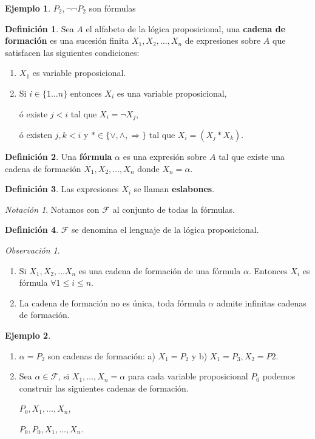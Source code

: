 \documentclass[a4paper,11pt]{article}
\theoremstyle{definition}
\newtheorem{defn}{Definición}[section]
\newtheorem{exap}{Ejemplo}[section]
\theoremstyle{remark}
\newtheorem*{remk}{Observación}
\newtheorem*{notc}{Notación}
\begin{document}
\begin{exap}
$P_2, \neg\neg P_2$ son fórmulas
\end{exap}

\begin{defn}
Sea $A$ el alfabeto de la lógica proposicional, una \textbf{cadena de
formación} es una sucesión finita $X_1, X_2, \dots, X_n$ de expresiones
sobre $A$ que satisfacen las siguientes condiciones:

\begin{enumerate}
\item $X_1$ es variable proposicional.
\item Si $i \in \{1\dots n\}$ entonces $X_i$ es una variable proposicional,

ó existe $j < i$ tal que $X_i = \neg X_j$, 

ó existen $j, k < i$ y $\ast \in \{ \vee, \wedge, \Rightarrow \}$ tal que 
$X_i = (X_j \ast X_k)$.
\end{enumerate}
\end{defn}

\begin{defn}
Una \textbf{fórmula} $\alpha$ es una expresión sobre $A$ tal que existe una
cadena de formación $X_1, X_2, \dots, X_n$ donde $X_n = \alpha$.
\end{defn}

\begin{defn}
Las expresiones $X_i$ se llaman \textbf{eslabones}.
\end{defn}

\begin{notc}
Notamos con $\mathcal F$ al conjunto de todas la fórmulas.
\end{notc}

\begin{defn}
$\mathcal F$ se denomina el lenguaje de la lógica proposicional.
\end{defn}

\begin{remk}
\begin{enumerate}
\item Si $X_1, X_2,\dots X_n$ es una cadena de formación de una fórmula $\alpha$. 
Entonces $X_i$ es fórmula $\forall 1 \le i \le n$.
\item La cadena de formación no es única, toda fórmula $\alpha$ admite
infinitas cadenas de formación.
\end{enumerate}
\end{remk}

\begin{exap}
\begin{enumerate}
\item $\alpha = P_2$ son cadenas de formación: a) $X_1 = P_2$ y b) $X_1 = P_3, X_2 = P2$.
\item Sea $\alpha \in \mathcal F$, si $X_1, \dots, X_n=\alpha$ 
para cada variable proposicional $P_0$ podemos construir las siguientes cadenas de formación.

$P_0, X_1, \dots, X_n$, 

$P_0, P_0, X_1, \dots, X_n$.
\end{enumerate}
\end{exap}
\end{document}
